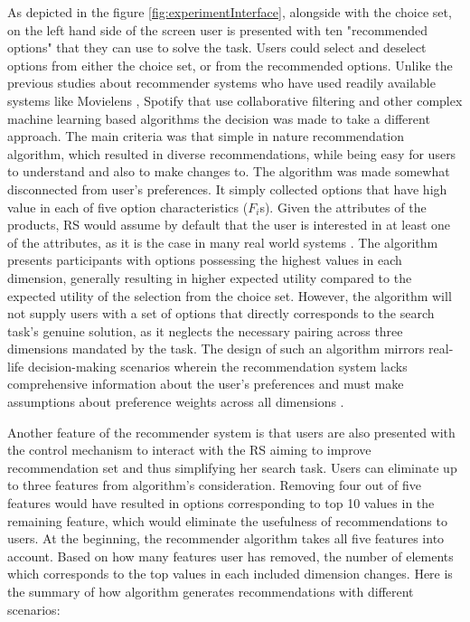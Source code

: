 \documentclass[a4paper,12pt]{article}
\begin{document}
As depicted in the figure \ref{fig:experimentInterface}, alongside with the choice set, on the left hand side of the screen user is presented with ten "recommended options" that they can use to solve the task. Users could select and deselect options from either the choice set, or from the recommended options. Unlike the previous studies about recommender systems who have used readily available systems like Movielens \citep{movielens2018}, Spotify \citep{millecampControllingSpotifyRecommendations2018} that use collaborative filtering and other complex machine learning based algorithms the decision was made  to take a different approach. The main criteria was that simple in nature recommendation algorithm, which resulted in diverse recommendations, while being easy for users to understand and also to make changes to. The algorithm was made somewhat disconnected from user's preferences. It simply collected options that have high value in each of five option characteristics ($F_i$s). Given the attributes of the products, RS would assume by default that the user is interested in at least one of the attributes, as it is the case in many real world systems \citep{guAddressingColdStartProblem2019}. The algorithm presents participants with options possessing the highest values in each dimension, generally resulting in higher expected utility compared to the expected utility of the selection from the choice set. However, the algorithm will not supply users with a set of options that directly corresponds to the search task's genuine solution, as it neglects the necessary pairing across three dimensions mandated by the task. The design of such an algorithm mirrors real-life decision-making scenarios wherein the recommendation system lacks comprehensive information about the user's preferences and must make assumptions about preference weights across all dimensions \citep{scheinMethodsMetricsColdStart}.

Another feature of the recommender system is that users are also presented with the control mechanism to interact with the RS aiming to improve recommendation set and thus simplifying her search task. Users can eliminate up to three features from algorithm's consideration. Removing four out of five features would have resulted in options corresponding to top 10 values in the remaining feature, which would eliminate the usefulness of recommendations to users. At the beginning, the recommender algorithm takes all five features into account. Based on how many features user has removed, the number of elements which corresponds to the top values in each included dimension changes. Here is the summary of how algorithm generates recommendations with different scenarios:
\end{document}
